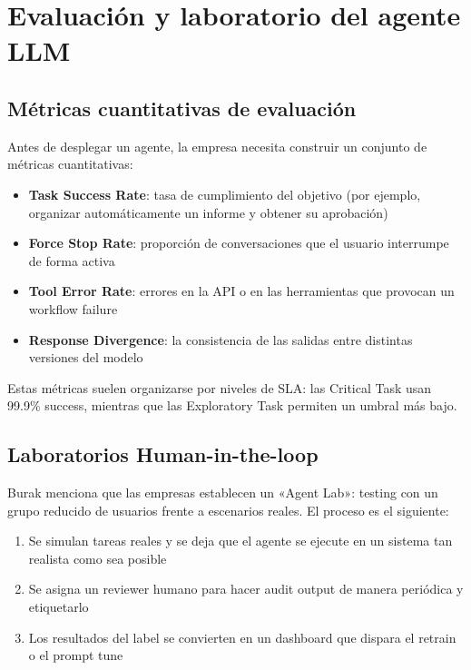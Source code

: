 \section{Evaluación y laboratorio del agente LLM}

\subsection{Métricas cuantitativas de evaluación}

Antes de desplegar un agente, la empresa necesita construir un conjunto de métricas cuantitativas:

\begin{itemize}
    \item \textbf{Task Success Rate}: tasa de cumplimiento del objetivo (por ejemplo, organizar automáticamente un informe y obtener su aprobación)
    \item \textbf{Force Stop Rate}: proporción de conversaciones que el usuario interrumpe de forma activa
    \item \textbf{Tool Error Rate}: errores en la API o en las herramientas que provocan un workflow failure
    \item \textbf{Response Divergence}: la consistencia de las salidas entre distintas versiones del modelo
\end{itemize}

Estas métricas suelen organizarse por niveles de SLA: las Critical Task usan 99.9\% success, mientras que las Exploratory Task permiten un umbral más bajo.

\subsection{Laboratorios Human-in-the-loop}

Burak menciona que las empresas establecen un «Agent Lab»: testing con un grupo reducido de usuarios frente a escenarios reales. El proceso es el siguiente:

\begin{enumerate}
    \item Se simulan tareas reales y se deja que el agente se ejecute en un sistema tan realista como sea posible
    \item Se asigna un reviewer humano para hacer audit output de manera periódica y etiquetarlo
    \item Los resultados del label se convierten en un dashboard que dispara el retrain o el prompt tune
\end{enumerate}

